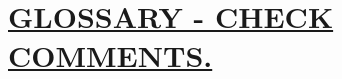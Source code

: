 \documentclass[12pt, arial]{article}
\begin{document}
\section* {\textbf{\underline{GLOSSARY - CHECK COMMENTS.}}} %
\end{document}
